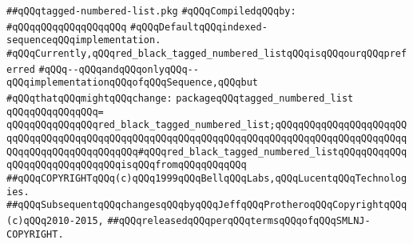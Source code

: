 \label{src/lib/src/tagged-numbered-list.pkg}
\verb|##qQQqtagged-numbered-list.pkg|\newline
\newline
\verb|#qQQqCompiledqQQqby:|\newline
\verb|#qQQqqQQqqQQqqQQqqQQq|\newline
\newline
\verb|#qQQqDefaultqQQqindexed-sequenceqQQqimplementation.|\newline
\verb|#qQQqCurrently,qQQqred_black_tagged_numbered_listqQQqisqQQqourqQQqpreferred|\newline
\verb|#qQQq--qQQqandqQQqonlyqQQq--qQQqimplementationqQQqofqQQqSequence,qQQqbut|\newline
\verb|#qQQqthatqQQqmightqQQqchange:|\newline
\newline
\verb|packageqQQqtagged_numbered_list|\newline
\verb|qQQqqQQqqQQqqQQq=|\newline
\verb|qQQqqQQqqQQqqQQqred_black_tagged_numbered_list;qQQqqQQqqQQqqQQqqQQqqQQqqQQqqQQqqQQqqQQqqQQqqQQqqQQqqQQqqQQqqQQqqQQqqQQqqQQqqQQqqQQqqQQqqQQqqQQqqQQqqQQqqQQqqQQqqQQq#qQQqred_black_tagged_numbered_listqQQqqQQqqQQqqQQqqQQqqQQqqQQqqQQqisqQQqfromqQQqqQQqqQQq|\newline
\newline
\newline
\verb|##qQQqCOPYRIGHTqQQq(c)qQQq1999qQQqBellqQQqLabs,qQQqLucentqQQqTechnologies.|\newline
\verb|##qQQqSubsequentqQQqchangesqQQqbyqQQqJeffqQQqProtheroqQQqCopyrightqQQq(c)qQQq2010-2015,|\newline
\verb|##qQQqreleasedqQQqperqQQqtermsqQQqofqQQqSMLNJ-COPYRIGHT.|\newline

